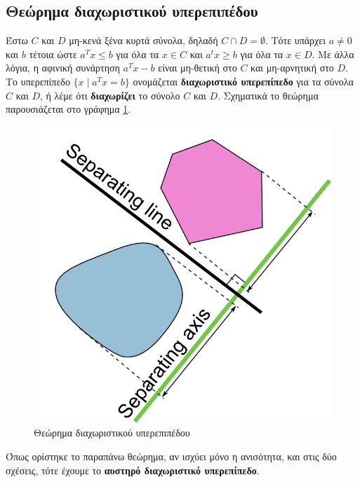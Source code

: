 \subsection{Θεώρημα διαχωριστικού υπερεπιπέδου} Έστω $C$ και $D$ μη-κενά ξένα κυρτά
σύνολα, δηλαδή $C \cap D = \emptyset$. Τότε υπάρχει $a \neq 0$ και $b$ τέτοια
ώστε $a^Tx \leq b$ για όλα τα $x \in C$ και $a^tx \geq b$ για όλα τα $x \in D$.
Με άλλα λόγια, η αφινική συνάρτηση $a^T x - b$ είναι μη-θετική στο $C$ και
μη-αρνητική στο $D$. Το υπερεπίπεδο $\{x \mid a^T x = b\}$ ονομάζεται
\textbf{διαχωριστικό υπερεπίπεδο} για τα σύνολα $C$ και $D$, ή λέμε ότι
\textbf{διαχωρίζει} το σύνολο $C$ και $D$. Σχηματικά το θεώρημα παρουσιάζεται
στο γράφημα \ref{fig:seperating_theorem}.
\begin{figure}[h]
    \centering
    \includegraphics[scale=0.3]{figures/Separating_axis_theorem2008.png}
    \caption{Θεώρημα διαχωριστικού υπερεπιπέδου}
    \label{fig:seperating_theorem}
\end{figure}
Όπως ορίστηκε το παραπάνω θεώρημα, αν ισχύει μόνο η ανισότητα, και στις δύο
σχέσεις, τότε έχουμε το \textbf{αυστηρό διαχωριστικό υπερεπίπεδο}.

